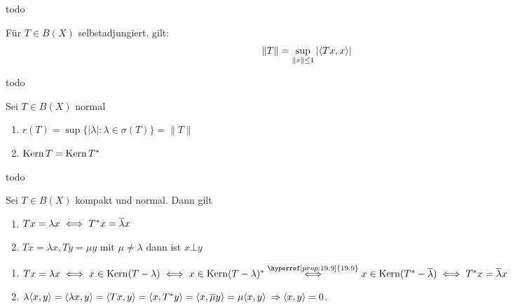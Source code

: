 \begin{beweis}
	todo %
\end{beweis}


\begin{prop}
	Für $T \in B(X)$ selbstadjungiert, gilt:
	\[ \| T \| = \sup_{\| x \| \leq 1} |\langle T x , x \rangle| \]	
\end{prop}

\begin{beweis}
	todo %
\end{beweis}


\begin{prop} \label{prop:19.9}
	Sei $T \in B(X)$ normal
	\begin{enumerate}
		\item $r(T) = \sup \{ | \lambda | : \lambda \in \sigma(T) \} = \| T \|$
		\item $\mathop{\rm Kern}\nolimits T = \mathop{\rm Kern}\nolimits T^{*}$
	\end{enumerate}	
\end{prop}

\begin{beweis}
	todo %
\end{beweis}


\begin{lemma}
	Sei $T \in B(X)$ kompakt und normal. Dann gilt
	\begin{enumerate}
		\item $T x = \lambda x \iff T^{*} x = \overline{\lambda} x$
		\item $T x = \lambda x, T y = \mu y$ mit $\mu \neq \lambda$  dann ist $x \bot y$
	\end{enumerate}
\end{lemma}

\begin{beweis}
	\begin{enumerate}[label=\alph*\upshape)]
		\item $T x = \lambda x \gdw x \in \kernn(T - \lambda) \gdw x \in \kernn(T - \lambda)^{*} \overset{\hyperref[prop:19.9]{19.9}}{\gdw} x \in \kernn(T^{*} - \overline{\lambda}) \gdw T^{*} x = \overline{\lambda} x$
		\item $\lambda \langle x , y \rangle = \langle \lambda x , y \rangle = \langle T x , y \rangle = \langle x , T^{*} y \rangle = \langle x , \overline{\mu} y \rangle = \mu \langle x, y \rangle$ $\Rightarrow \langle x , y \rangle = 0$.
	\end{enumerate}	
\end{beweis}


	
\newpage